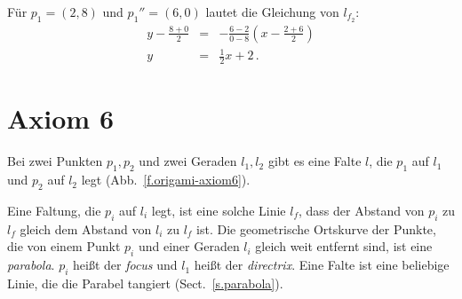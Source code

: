 \begin{example}
Für $p_1=(2,8)$ und $p_1''=(6,0)$ lautet die Gleichung von $l_{f_2}$:
\begin{eqnarray*}
y-\frac{8+0}{2}&=&-\frac{6-2}{0-8}\left(x-\frac{2+6}{2}\right)\\
y&=&\frac{1}{2}x+2\,.
\end{eqnarray*}
\end{example}


\section{Axiom 6}\label{s.ax6}
\begin{axiom}
Bei zwei Punkten $p_1,p_2$ und zwei Geraden $l_1,l_2$ gibt es eine Falte $l$, die $p_1$ auf $l_1$ und $p_2$ auf $l_2$ legt (Abb.~\ref{f.origami-axiom6}).
\end{axiom}

Eine Faltung, die $p_i$ auf $l_i$ legt, ist eine solche Linie $l_f$, dass der Abstand von $p_i$ zu $l_f$ gleich dem Abstand von $l_i$ zu $l_f$ ist. Die geometrische Ortskurve der Punkte, die von einem Punkt $p_i$ und einer Geraden $l_i$ gleich weit entfernt sind, ist eine \emph{parabola}. $p_i$ heißt der \emph{focus} und $l_1$ heißt der \emph{directrix}. Eine Falte ist eine beliebige Linie, die die Parabel tangiert (Sect.~\ref{s.parabola}).


